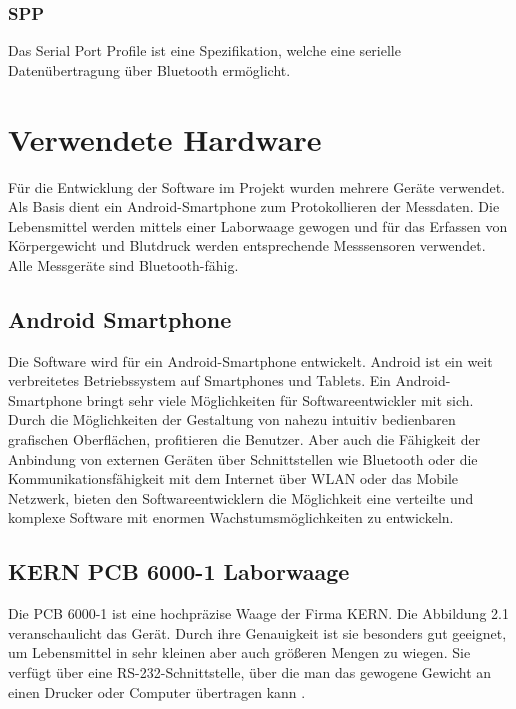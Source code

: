 \subsubsection{SPP}

Das Serial Port Profile ist eine Spezifikation, welche eine serielle Daten\"ubertragung \"uber Bluetooth erm\"oglicht. \\

\section{Verwendete Hardware}

F\"ur die Entwicklung der Software im Projekt wurden mehrere Ger\"ate verwendet. 
Als Basis dient ein Android-Smartphone zum Protokollieren der Messdaten.
Die Lebensmittel werden mittels einer Laborwaage gewogen und
f\"ur das Erfassen von K\"orpergewicht und Blutdruck werden entsprechende Messsensoren verwendet.
Alle Messger\"ate sind Bluetooth-f\"ahig.\\

\subsection{Android Smartphone}

Die Software wird f\"ur ein Android-Smartphone entwickelt.
Android ist ein weit verbreitetes Betriebssystem auf Smartphones und Tablets. 
Ein Android-Smartphone bringt sehr viele M\"oglichkeiten f\"ur Softwareentwickler mit sich. 
Durch die M\"oglichkeiten der Gestaltung von nahezu intuitiv bedienbaren grafischen Oberfl\"achen, profitieren die Benutzer.
Aber auch die F\"ahigkeit der Anbindung von externen Ger\"aten \"uber Schnittstellen wie Bluetooth
oder die Kommunikationsf\"ahigkeit mit dem Internet \"uber WLAN oder das Mobile Netzwerk, bieten den
Softwareentwicklern die M\"oglichkeit eine verteilte und komplexe Software mit enormen Wachstumsm\"oglichkeiten zu entwickeln.\\

\subsection{KERN PCB 6000-1 Laborwaage}

Die PCB 6000-1 ist eine hochpr\"azise Waage der Firma KERN. 
Die Abbildung 2.1 veranschaulicht das Ger\"at.
Durch ihre Genauigkeit ist sie besonders gut geeignet, um Lebensmittel in sehr kleinen aber auch gr\"o\ss{}eren Mengen zu wiegen.
Sie verf\"ugt \"uber eine RS-232-Schnittstelle, \"uber die man das gewogene Gewicht an einen Drucker oder Computer
\"ubertragen kann \cite[S. 18 - 19]{KERNPCB}.\\

